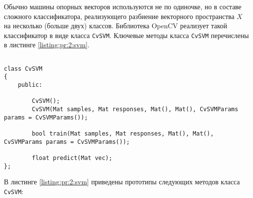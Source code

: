 Обычно машины опорных векторов используются не по одиночке, но в составе сложного классификатора, реализующего разбиение векторного пространства $X$ на несколько (больше двух) классов. Библиотека OpenCV реализует такой классификатор в виде класса \verb|CvSVM|. Ключевые методы класса \verb|CvSVM| перечислены в листинге \ref{listing:pr:2:svm}.

\begin{lstlisting}

class CvSVM
{
	public:

		CvSVM();
		CvSVM(Mat samples, Mat responses, Mat(), Mat(), CvSVMParams params = CvSVMParams());

		bool train(Mat samples, Mat responses, Mat(), Mat(), CvSVMParams params = CvSVMParams());

		float predict(Mat vec);
};

\end{lstlisting}
\mylistingend

В листинге \ref{listing:pr:2:svm} приведены прототипы следующих методов класса \verb|CvSVM|:

